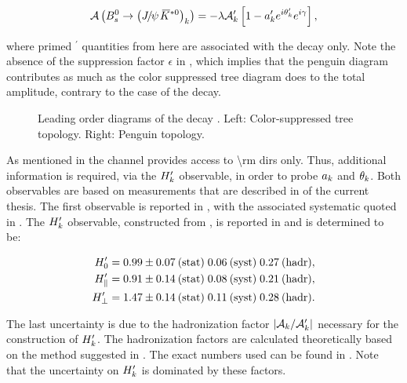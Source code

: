 \begin{equation}
  \mathcal{A} \parenthesis{\BsJpsiKstPolState{k}} = -\lambda \formFctr{k}' \brackets{ 1 - \akPeng' e^{i\thkPeng'} e^{i\gamma} },
  \label{bsjpsikst_amp}
\end{equation}

\noindent where primed ${}^\prime$ quantities from here are associated with the \BsJpsiKst decay only.
Note the absence of the suppression factor $\epsilon$ in , which implies that the penguin diagram
contributes as much as the color suppressed tree diagram does to the total amplitude, contrary to the case of the \BsJpsiPhi decay.

\begin{figure}[t]
  \centering
  \scalebox{0.9}{\sffamily }
  \caption{Leading order diagrams of the decay \BsJpsiKst. Left: Color-suppressed tree topology. Right: Penguin topology.}
  \label{bs2jpsikst}
\end{figure}

As mentioned in  the \BsJpsiKst channel provides access to \Acp{\rm dir} only.
Thus, additional information is required, via the $H_{k}'$ observable, in order to probe $a_k$ and $\theta_k$.
Both observables are based on measurements that are described in  of the current thesis.
The first observable is reported in , with the associated systematic quoted in .
The $H_{k}'$ observable, constructed from \BRof{\BsJpsiKst}, is reported in 
and is determined to be:

\begin{subequations}
  \label{hobs_jpsikst}
  \begin{align}
  H_{0}'         & = 0.99 \pm 0.07\:\text{(stat)} \; 0.06\:\text{(syst)} \; 0.27\:(\text{hadr}) , \label{hobs_jpsikst_long} \\
  H_{\parallel}' & = 0.91 \pm 0.14\:\text{(stat)} \; 0.08\:\text{(syst)} \; 0.21\:(\text{hadr}) , \label{hobs_jpsikst_para} \\
  H_{\perp}'     & = 1.47 \pm 0.14\:\text{(stat)} \; 0.11\:\text{(syst)} \; 0.28\:(\text{hadr}) . \label{hobs_jpsikst_perp}
  \end{align}
\end{subequations}

\noindent The last uncertainty is due to the hadronization factor $|\mathcal{A}_{k}/\mathcal{A}_{k}'|$ necessary for the construction of $H_{k}'$.
The hadronization factors are calculated theoretically based on the method suggested in \cite{eff-hamiltonian-bs-syst}.
The exact numbers used can be found in \cite{DeBruyn-thesis}. Note that the uncertainty on $H_{k}'$ is dominated by these factors.

